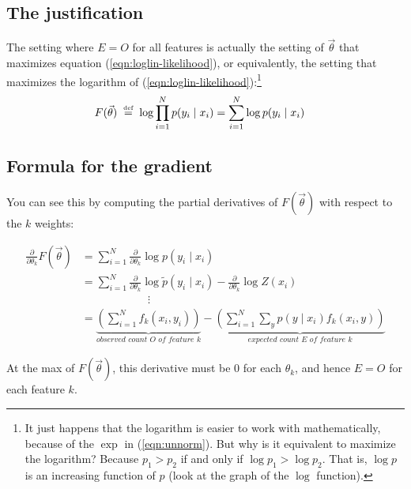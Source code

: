 \documentclass[11pt]{article}
\newcommand{\defeq}{\;\stackrel{\mbox{\tiny def}}{=}\;}
\newcommand{\vtheta}{\vec{\theta}}
\newcommand{\ptilde}{\tilde{p}}
\newcommand{\diffk}{\frac{\partial}{\partial \theta_k}}
\begin{document}
\subsection{The justification}

The setting where $E=O$ for all features is actually the
setting of $\vtheta$ that maximizes equation
(\ref{eqn:loglin-likelihood}), or equivalently, the setting that
maximizes the logarithm of (\ref{eqn:loglin-likelihood}):\footnote{It
  just happens that the logarithm is easier to work with
  mathematically, because of the $\exp$ in (\ref{eqn:unnorm}).  But
  why is it equivalent to maximize the logarithm?  Because $p_1 > p_2$
  if and only if $\log p_1 > \log p_2$.  That is, $\log p$ is
  an increasing function of $p$ (look at the graph of the $\log$ function).%
}
\begin{align}
  F(\vtheta) & \defeq \log \prod_{i=1}^N p(y_i \mid x_i) = \sum_{i=1}^N \log p(y_i \mid x_i)
\label{eqn:loglin-log-likelihood}
\end{align}

\subsection{Formula for the gradient}

You can see this by computing the partial derivatives of $F(\vtheta)$
with respect to the $k$ weights:

\begin{align}
  \diffk F(\vtheta)
  &= \sum_{i=1}^N \diffk \log p(y_i \mid x_i)  \\ %
  &= \sum_{i=1}^N \diffk \log \ptilde(y_i \mid x_i) - \diffk \log Z(x_i) \\
  & \hspace{1in}\vdots \nonumber \\
  &= \underbrace{\left( \sum_{i=1}^N f_k(x_i,y_i) \right)}_{\textit{observed count $O$ of feature $k$}}
  - \underbrace{\left( \sum_{i=1}^N \sum_y p(y\mid x_i) f_k(x_i,y) \right)}_{\textit{expected count $E$ of feature $k$}} \label{eqn:obsexp}
\end{align}

At the max of $F(\vtheta)$, this derivative must be 0 for each
$\theta_k$, and hence $E=O$ for each feature $k$.
\end{document}
